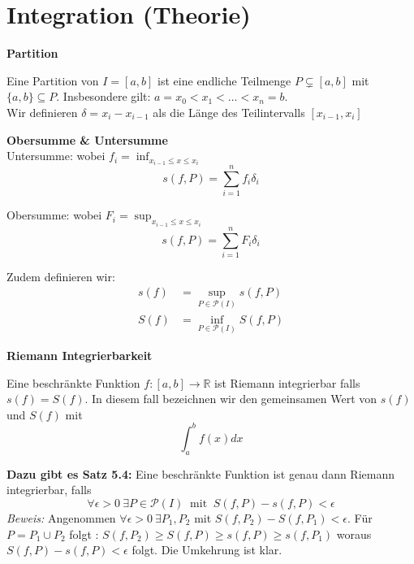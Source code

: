 \documentclass[25pt]{sciposter}
\newcommand{\R}{\mathbb{R}}
\newenvironment{method}[1]{\begin{mdframed}[backgroundcolor=blue!10,innertopmargin=15pt, innerbottommargin=15pt, nobreak=true]
		\textbf{#1 }
	}
	{ 
	\end{mdframed}
}
\begin{document}
\begin{multicols}{3}
\begin{itemize}
	
\end{itemize}









\section*{Integration (Theorie)}



\begin{method}{Partition}
	Eine Partition von $I = [a,b]$ ist eine endliche Teilmenge $P \subsetneq [a,b]$ mit $\{a,b\} \subseteq P$. Insbesondere gilt: $ a = x_0 < x_1 < \ldots < x_{n} = b$.\\
	Wir definieren $\delta = x_i - x_{i-1}$ als die Länge des Teilintervalls $[x_{i-1} , x_i]$
\end{method}

\begin{method}{Obersumme \& Untersumme}\\
Untersumme: wobei $f_i = \inf_{x_{i-1} \leq x \leq x_i} $
$$s(f,P) = \sum_{i=1}^{n} f_i \delta _i$$ 

Obersumme: wobei $F_i = \sup_{x_{i-1} \leq x \leq x_i} $
$$s(f,P) = \sum_{i=1}^{n} F_i \delta _i$$ 

Zudem definieren wir:
\begin{align*}
	s(f) &= \sup_{P \in \mathcal{P}(I)} s(f,P)\\
	S(f) &= \inf_{P \in \mathcal{P}(I)} S(f,P)
\end{align*}
\end{method}

\begin{method}{Riemann Integrierbarkeit}
Eine beschränkte Funktion $f:[a,b] \to \R$ ist Riemann integrierbar falls $s(f) = S(f)$. In diesem fall bezeichnen wir den gemeinsamen Wert von $s(f)$ und $S(f)$ mit 
$$\int_{a}^b f(x) dx$$

\textbf{Dazu gibt es Satz 5.4:} Eine beschränkte Funktion ist genau dann Riemann integrierbar, falls
$$\forall \epsilon > 0 \ \exists P \in \mathcal{P}(I) \ \text{ mit } \ S(f,P) - s(f,P) < \epsilon$$
\textit{Beweis:} Angenommen $\forall \epsilon > 0 \ \exists P_1, P_2$ mit $S(f,P_2) - S(f,P_1) < \epsilon$. Für $P = P_1 \cup P_2$ folgt :
$S(f,P_2)\geq S(f,P) \geq s(f,P) \geq s(f,P_1)$ woraus $S(f,P)- s(f,P) < \epsilon$ folgt. Die Umkehrung ist klar.
\end{method}



\end{multicols}
\end{document}
